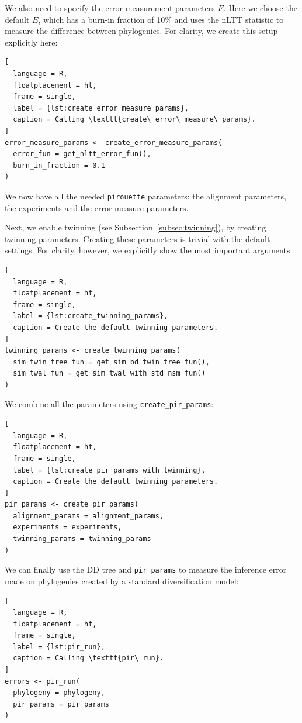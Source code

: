 We also need to specify the error measurement parameters $\mathit{E}$.
Here we choose the default $\mathit{E}$, which has a burn-in fraction 
of 10\% and uses the nLTT statistic to
measure the difference between phylogenies. For clarity,
we create this setup explicitly here:

\begin{lstlisting}[
  language = R,
  floatplacement = ht,
  frame = single,
  label = {lst:create_error_measure_params},
  caption = Calling \texttt{create\_error\_measure\_params}.
]
error_measure_params <- create_error_measure_params(
  error_fun = get_nltt_error_fun(),
  burn_in_fraction = 0.1
)
\end{lstlisting}

We now have all the needed \verb;pirouette; parameters: the alignment 
parameters, the experiments and the error measure parameters.


Next, we enable twinning (see Subsection~\ref{subsec:twinning}),
by creating twinning parameters.
Creating these parameters is trivial with the default settings.
For clarity, however, we explicitly show the most important arguments:

\begin{lstlisting}[
  language = R,
  floatplacement = ht,
  frame = single,
  label = {lst:create_twinning_params},
  caption = Create the default twinning parameters.
]
twinning_params <- create_twinning_params(
  sim_twin_tree_fun = get_sim_bd_twin_tree_fun(),
  sim_twal_fun = get_sim_twal_with_std_nsm_fun()
)
\end{lstlisting}

We combine all the parameters using \verb;create_pir_params;:

\begin{lstlisting}[
  language = R,
  floatplacement = ht,
  frame = single,
  label = {lst:create_pir_params_with_twinning},
  caption = Create the default twinning parameters.
]
pir_params <- create_pir_params(
  alignment_params = alignment_params,
  experiments = experiments,
  twinning_params = twinning_params
)
\end{lstlisting}

We can finally use the DD tree and \verb;pir_params; to measure the 
inference error made on phylogenies
created by a standard diversification model:

\begin{lstlisting}[
  language = R,
  floatplacement = ht,
  frame = single,
  label = {lst:pir_run},
  caption = Calling \texttt{pir\_run}.
]
errors <- pir_run(
  phylogeny = phylogeny,
  pir_params = pir_params
)
\end{lstlisting}

